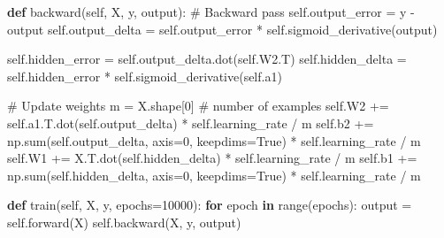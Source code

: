\documentclass[
  letterpaper,
  DIV=11,
  numbers=noendperiod]{scrreprt}
\newenvironment{Shaded}{\begin{snugshade}}{\end{snugshade}}
\newcommand{\BuiltInTok}[1]{\textcolor[rgb]{0.00,0.23,0.31}{#1}}
\newcommand{\CommentTok}[1]{\textcolor[rgb]{0.37,0.37,0.37}{#1}}
\newcommand{\ControlFlowTok}[1]{\textcolor[rgb]{0.00,0.23,0.31}{\textbf{#1}}}
\newcommand{\DecValTok}[1]{\textcolor[rgb]{0.68,0.00,0.00}{#1}}
\newcommand{\KeywordTok}[1]{\textcolor[rgb]{0.00,0.23,0.31}{\textbf{#1}}}
\newcommand{\NormalTok}[1]{\textcolor[rgb]{0.00,0.23,0.31}{#1}}
\newcommand{\OperatorTok}[1]{\textcolor[rgb]{0.37,0.37,0.37}{#1}}
\newcommand{\VariableTok}[1]{\textcolor[rgb]{0.07,0.07,0.07}{#1}}
\begin{document}
\begin{Shaded}
\begin{Highlighting}[]
    \KeywordTok{def}\NormalTok{ backward(}\VariableTok{self}\NormalTok{, X, y, output):}
        \CommentTok{\# Backward pass}
        \VariableTok{self}\NormalTok{.output\_error }\OperatorTok{=}\NormalTok{ y }\OperatorTok{{-}}\NormalTok{ output}
        \VariableTok{self}\NormalTok{.output\_delta }\OperatorTok{=} \VariableTok{self}\NormalTok{.output\_error }\OperatorTok{*} \VariableTok{self}\NormalTok{.sigmoid\_derivative(output)}
        
        \VariableTok{self}\NormalTok{.hidden\_error }\OperatorTok{=} \VariableTok{self}\NormalTok{.output\_delta.dot(}\VariableTok{self}\NormalTok{.W2.T)}
        \VariableTok{self}\NormalTok{.hidden\_delta }\OperatorTok{=} \VariableTok{self}\NormalTok{.hidden\_error }\OperatorTok{*} \VariableTok{self}\NormalTok{.sigmoid\_derivative(}\VariableTok{self}\NormalTok{.a1)}
        
        \CommentTok{\# Update weights}
\NormalTok{        m }\OperatorTok{=}\NormalTok{ X.shape[}\DecValTok{0}\NormalTok{]  }\CommentTok{\# number of examples}
        \VariableTok{self}\NormalTok{.W2 }\OperatorTok{+=} \VariableTok{self}\NormalTok{.a1.T.dot(}\VariableTok{self}\NormalTok{.output\_delta) }\OperatorTok{*} \VariableTok{self}\NormalTok{.learning\_rate }\OperatorTok{/}\NormalTok{ m}
        \VariableTok{self}\NormalTok{.b2 }\OperatorTok{+=}\NormalTok{ np.}\BuiltInTok{sum}\NormalTok{(}\VariableTok{self}\NormalTok{.output\_delta, axis}\OperatorTok{=}\DecValTok{0}\NormalTok{, keepdims}\OperatorTok{=}\VariableTok{True}\NormalTok{) }\OperatorTok{*} \VariableTok{self}\NormalTok{.learning\_rate }\OperatorTok{/}\NormalTok{ m}
        \VariableTok{self}\NormalTok{.W1 }\OperatorTok{+=}\NormalTok{ X.T.dot(}\VariableTok{self}\NormalTok{.hidden\_delta) }\OperatorTok{*} \VariableTok{self}\NormalTok{.learning\_rate }\OperatorTok{/}\NormalTok{ m}
        \VariableTok{self}\NormalTok{.b1 }\OperatorTok{+=}\NormalTok{ np.}\BuiltInTok{sum}\NormalTok{(}\VariableTok{self}\NormalTok{.hidden\_delta, axis}\OperatorTok{=}\DecValTok{0}\NormalTok{, keepdims}\OperatorTok{=}\VariableTok{True}\NormalTok{) }\OperatorTok{*} \VariableTok{self}\NormalTok{.learning\_rate }\OperatorTok{/}\NormalTok{ m}
    
    \KeywordTok{def}\NormalTok{ train(}\VariableTok{self}\NormalTok{, X, y, epochs}\OperatorTok{=}\DecValTok{10000}\NormalTok{):}
        \ControlFlowTok{for}\NormalTok{ epoch }\KeywordTok{in} \BuiltInTok{range}\NormalTok{(epochs):}
\NormalTok{            output }\OperatorTok{=} \VariableTok{self}\NormalTok{.forward(X)}
            \VariableTok{self}\NormalTok{.backward(X, y, output)}
            

\end{Highlighting}
\end{Shaded}
\end{document}
